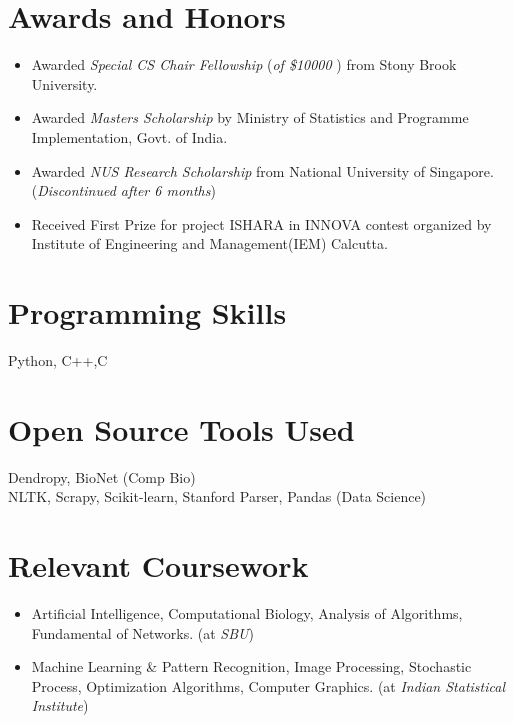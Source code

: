 \documentclass{res}
\begin{document}
\begin{resume}
\section{Awards and Honors}
   \begin{itemize}
   \item Awarded {\it Special CS Chair Fellowship} ({\it of \$10000} ) from Stony Brook University.
   \item Awarded {\it Masters Scholarship} by Ministry of Statistics and Programme Implementation, Govt. of India. 
   \item Awarded {\it NUS Research Scholarship} from National University of Singapore. ({\it Discontinued after 6 months})
   \item Received {\color{blue} First Prize} for project ISHARA in INNOVA contest organized by Institute of Engineering and Management(IEM) Calcutta.
   \end{itemize}

\section{Programming Skills}
Python, C++,C

\section{\bf Open Source Tools Used}
Dendropy, BioNet  (Comp Bio) \\
NLTK, Scrapy, Scikit-learn, Stanford Parser, Pandas (Data Science) \\



\section{Relevant Coursework} 
\begin{itemize}
\item Artificial Intelligence,  Computational Biology, Analysis of Algorithms, Fundamental of Networks. (at {\it SBU})
\item Machine Learning \& Pattern Recognition, Image Processing, Stochastic Process, Optimization Algorithms, Computer Graphics. (at {\it
Indian Statistical Institute})
\end{itemize}



\end{resume}
\end{document}
